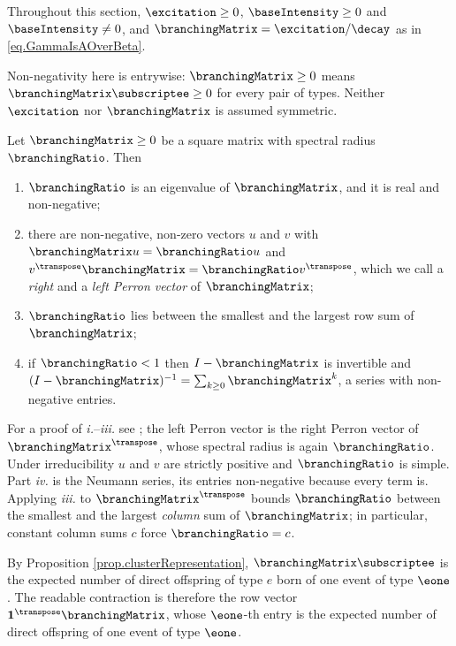 Throughout this section, $\excitation \geq 0$, $\baseIntensity \geq 0$ and
$\baseIntensity \neq 0$,
and $\branchingMatrix = \excitation/\decay$ as in \eqref{eq.GammaIsAOverBeta}.

Non-negativity here is entrywise: $\branchingMatrix \geq 0$ means
$\branchingMatrix\subscriptee \geq 0$ for every pair of types.
Neither $\excitation$ nor $\branchingMatrix$ is assumed symmetric.

\begin{lemma}\label{lemma.perronFrobenius}
 Let $\branchingMatrix \geq 0$ be a square matrix with spectral radius $\branchingRatio$.
 Then
 \begin{enumerate}[label={\emph{\roman{*}}.}]
  \item $\branchingRatio$ is an eigenvalue of $\branchingMatrix$, and it is real
        and non-negative;
  \item there are non-negative, non-zero vectors $u$ and $v$ with
        $\branchingMatrix u = \branchingRatio u$ and
        $v^{\transpose}\branchingMatrix = \branchingRatio v^{\transpose}$,
        which we call a \emph{right} and a \emph{left Perron vector} of $\branchingMatrix$;
  \item $\branchingRatio$ lies between the smallest and the largest row sum of
        $\branchingMatrix$;
  \item if $\branchingRatio < 1$ then $I - \branchingMatrix$ is invertible and
        $(I-\branchingMatrix)^{-1} = \sum_{k\geq 0}\branchingMatrix^{k}$,
        a series with non-negative entries.
 \end{enumerate}
\end{lemma}
For a proof of \emph{i.}--\emph{iii.} see
\cite[Theorem 8.3.1 and Theorem 8.1.22]{HJ13mat};
the left Perron vector is the right Perron vector of $\branchingMatrix^{\transpose}$,
whose spectral radius is again $\branchingRatio$.
Under irreducibility $u$ and $v$ are strictly positive and $\branchingRatio$ is simple.
Part \emph{iv.} is the Neumann series, its entries non-negative because every term is.
Applying \emph{iii.} to $\branchingMatrix^{\transpose}$ bounds $\branchingRatio$ between the
smallest and the largest \emph{column} sum of $\branchingMatrix$;
in particular, constant column sums $c$ force $\branchingRatio = c$.

By Proposition \ref{prop.clusterRepresentation},
$\branchingMatrix\subscriptee$ is the expected number of direct offspring of type $e$
born of one event of type $\eone$.
The readable contraction is therefore the row vector
$\mathbf{1}^{\transpose}\branchingMatrix$,
whose $\eone$-th entry is the expected number of direct offspring of one event of type
$\eone$.

